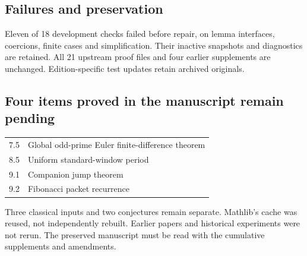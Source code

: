 \subsection*{Failures and preservation}
Eleven of 18 development checks failed before repair, on lemma interfaces, coercions, finite cases and simplification. Their inactive snapshots and diagnostics are retained. All 21 upstream proof files and four earlier supplements are unchanged. Edition-specific test updates retain archived originals.

\subsection*{Four items proved in the manuscript remain pending}
\begin{center}
\begin{tabular}{@{}lp{}@{}}
7.5 & Global odd-prime Euler finite-difference theorem\\
8.5 & Uniform standard-window period\\
9.1 & Companion jump theorem\\
9.2 & Fibonacci packet recurrence\\
\end{tabular}
\end{center}
Three classical inputs and two conjectures remain separate. Mathlib's cache was reused, not independently rebuilt. Earlier papers and historical experiments were not rerun. The preserved manuscript must be read with the cumulative supplements and amendments.
